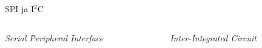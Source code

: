 \documentclass[pdf]{beamer}
\begin{document}
\begin{frame}{SPI ja I\({}^2\)C}
    \begin{columns}
        \begin{column}{0.46\textwidth}
            \begin{block}{\textit{Serial Peripheral Interface}}
            \end{block}
        \end{column}
        \begin{column}{0.46\textwidth}
            \begin{block}{\textit{Inter-Integrated Circuit}}
            \end{block}
        \end{column}
    \end{columns}
\end{frame}
\end{document}
